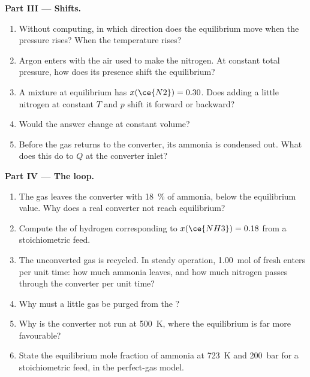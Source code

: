 \begin{problem}
\medskip
\noindent\textbf{Part III --- Shifts.}
\begin{enumerate}[resume]
  \item Without computing, in which direction does the equilibrium move when
        the pressure rises? When the temperature rises?
  \item Argon enters with the air used to make the nitrogen. At constant total
        pressure, how does its presence shift the equilibrium?
  \item A mixture at equilibrium has $x(\ce{N2}) = 0.30$. Does adding a little
        nitrogen at constant $T$ and $p$ shift it forward or backward?
  \item Would the answer change at constant volume?
  \item Before the gas returns to the converter, its ammonia is condensed
        out. What does this do to $Q$ at the converter inlet?
\end{enumerate}

\medskip
\noindent\textbf{Part IV --- The loop.}
\begin{enumerate}[resume]
  \item The gas leaves the converter with \qty{18}{\percent} of ammonia, below
        the equilibrium value. Why does a real converter not reach
        equilibrium?
  \item Compute the  of hydrogen corresponding to
        $x(\ce{NH3}) = 0.18$ from a stoichiometric feed.
  \item The unconverted gas is recycled. In steady operation, \qty{1.00}{mol}
        of fresh  enters per unit time: how much ammonia leaves, and how
        much nitrogen passes through the converter per unit time?
  \item Why must a little gas be purged from the ?
  \item Why is the converter not run at \qty{500}{K}, where the equilibrium is
        far more favourable?
  \item State the equilibrium mole fraction of ammonia at \qty{723}{K} and
        \qty{200}{bar} for a stoichiometric feed, in the perfect-gas model.
\end{enumerate}
\end{problem}
